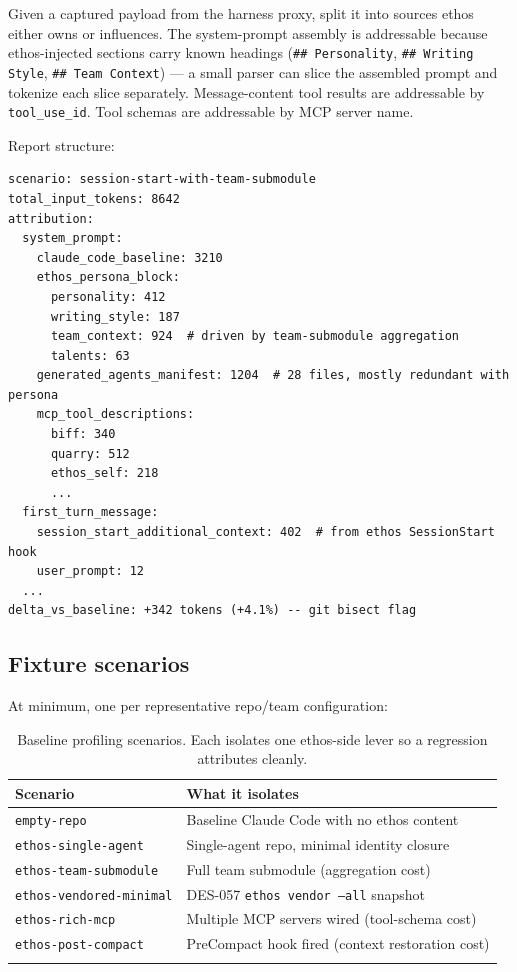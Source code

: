 \documentclass[a4paper,10pt]{article}
\newcommand{\field}[1]{\texttt{#1}}
\begin{document}
Given a captured payload from the harness proxy, split it into sources ethos
either owns or influences.  The system-prompt assembly is
addressable because ethos-injected sections carry known headings
(\texttt{\#\# Personality}, \texttt{\#\# Writing Style},
\texttt{\#\# Team Context}) --- a small parser can slice the
assembled prompt and tokenize each slice separately.  Message-content
tool results are addressable by \field{tool\_use\_id}.  Tool schemas
are addressable by MCP server name.

Report structure:

\begin{lstlisting}[language={}]
scenario: session-start-with-team-submodule
total_input_tokens: 8642
attribution:
  system_prompt:
    claude_code_baseline: 3210
    ethos_persona_block:
      personality: 412
      writing_style: 187
      team_context: 924  # driven by team-submodule aggregation
      talents: 63
    generated_agents_manifest: 1204  # 28 files, mostly redundant with persona
    mcp_tool_descriptions:
      biff: 340
      quarry: 512
      ethos_self: 218
      ...
  first_turn_message:
    session_start_additional_context: 402  # from ethos SessionStart hook
    user_prompt: 12
  ...
delta_vs_baseline: +342 tokens (+4.1%) -- git bisect flag
\end{lstlisting}

\subsection*{Fixture scenarios}

At minimum, one per representative repo/team configuration:

\begin{longtable}{ll}
\toprule
\textbf{Scenario} & \textbf{What it isolates} \\
\midrule
\endhead
\texttt{empty-repo}          & Baseline Claude Code with no ethos content \\
\texttt{ethos-single-agent}  & Single-agent repo, minimal identity closure \\
\texttt{ethos-team-submodule} & Full team submodule (aggregation cost) \\
\texttt{ethos-vendored-minimal} & DES-057 \texttt{ethos vendor --all} snapshot \\
\texttt{ethos-rich-mcp}      & Multiple MCP servers wired (tool-schema cost) \\
\texttt{ethos-post-compact}  & PreCompact hook fired (context restoration cost) \\
\bottomrule
\caption{Baseline profiling scenarios.  Each isolates one
  ethos-side lever so a regression attributes cleanly.}
\end{longtable}
\end{document}

